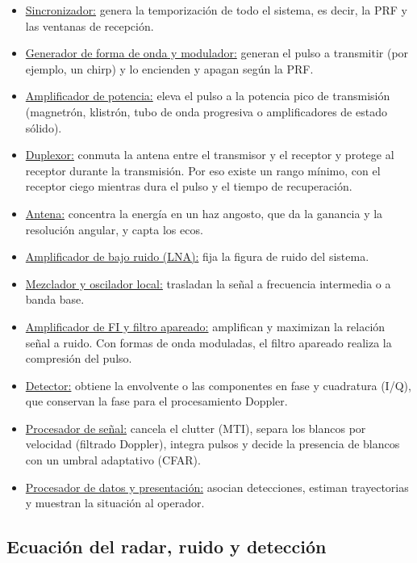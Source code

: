 \begin{itemize}
    \item \underline{Sincronizador:} genera la temporización de todo el sistema, es decir, la PRF y las ventanas de recepción.
    \item \underline{Generador de forma de onda y modulador:} generan el pulso a transmitir (por ejemplo, un chirp) y lo encienden y apagan según la PRF.
    \item \underline{Amplificador de potencia:} eleva el pulso a la potencia pico de transmisión (magnetrón, klistrón, tubo de onda progresiva o amplificadores de estado sólido).
    \item \underline{Duplexor:} conmuta la antena entre el transmisor y el receptor y protege al receptor durante la transmisión. Por eso existe un rango mínimo, con el receptor ciego mientras dura el pulso y el tiempo de recuperación.
    \item \underline{Antena:} concentra la energía en un haz angosto, que da la ganancia y la resolución angular, y capta los ecos.
    \item \underline{Amplificador de bajo ruido (LNA):} fija la figura de ruido del sistema.
    \item \underline{Mezclador y oscilador local:} trasladan la señal a frecuencia intermedia o a banda base.
    \item \underline{Amplificador de FI y filtro apareado:} amplifican y maximizan la relación señal a ruido. Con formas de onda moduladas, el filtro apareado realiza la compresión del pulso.
    \item \underline{Detector:} obtiene la envolvente o las componentes en fase y cuadratura (I/Q), que conservan la fase para el procesamiento Doppler.
    \item \underline{Procesador de señal:} cancela el clutter (MTI), separa los blancos por velocidad (filtrado Doppler), integra pulsos y decide la presencia de blancos con un umbral adaptativo (CFAR).
    \item \underline{Procesador de datos y presentación:} asocian detecciones, estiman trayectorias y muestran la situación al operador.
\end{itemize}

\subsection{Ecuación del radar, ruido y detección}
\label{sec:ecuacion}

